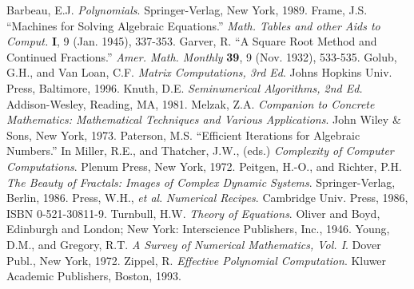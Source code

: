 \documentclass[twocolumn,epsf]{snBaker}
\begin{document}
\begin{thebibliography}{7}
%
Barbeau, E.J.  {\it Polynomials}.  Springer-Verlag, New York, 1989.
%
Frame, J.S.  ``Machines for Solving Algebraic Equations.''  {\it Math. Tables
and other Aids to Comput.} {\bf I}, 9 (Jan. 1945), 337-353.
%
Garver, R.  ``A Square Root Method and Continued Fractions.''  {\it
Amer. Math. Monthly} {\bf 39}, 9 (Nov. 1932), 533-535.
%
Golub, G.H., and Van Loan, C.F.  {\it Matrix Computations, 3rd Ed}.  Johns Hopkins
Univ. Press, Baltimore, 1996.
%
Knuth, D.E.  {\it Seminumerical Algorithms, 2nd Ed.}  Addison-Wesley, Reading, MA, 1981.
%
Melzak, Z.A.  {\it Companion to Concrete Mathematics: Mathematical Techniques and
Various Applications}.  John Wiley \& Sons, New York, 1973.
%
Paterson, M.S.  ``Efficient Iterations for Algebraic Numbers.''  In Miller, R.E.,
and Thatcher, J.W., (eds.)  {\it Complexity of Computer Computations}.  Plenum Press,
New York, 1972.
%
Peitgen, H.-O., and Richter, P.H.  {\it The Beauty of Fractals: Images of Complex
Dynamic Systems}.  Springer-Verlag, Berlin, 1986.
%
Press, W.H., {\it et al}.  {\it Numerical Recipes}.  Cambridge Univ.
Press, 1986, ISBN 0-521-30811-9.
%
Turnbull, H.W.  {\it Theory of Equations}.  Oliver and Boyd, Edinburgh and London;
New York: Interscience Publishers, Inc., 1946.
%
Young, D.M., and Gregory, R.T.  {\it A Survey of Numerical
Mathematics, Vol. I}.  Dover Publ., New York, 1972.
%
Zippel, R.  {\it Effective Polynomial Computation}.  Kluwer Academic Publishers,
Boston, 1993.
%
\end{thebibliography}

\SpewBio
\end{document}
